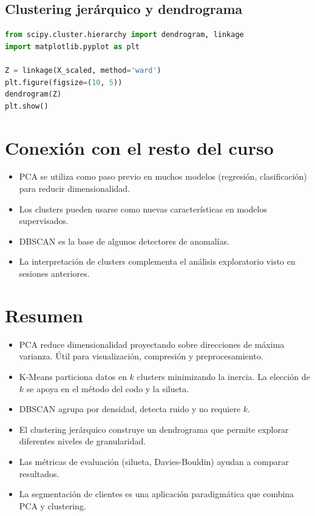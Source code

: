 \documentclass[12pt,a4paper,openany,oneside]{book}
\begin{document}
\subsection{Clustering jerárquico y dendrograma}
\begin{lstlisting}[language=Python]
from scipy.cluster.hierarchy import dendrogram, linkage
import matplotlib.pyplot as plt

Z = linkage(X_scaled, method='ward')
plt.figure(figsize=(10, 5))
dendrogram(Z)
plt.show()
\end{lstlisting}

\section{Conexión con el resto del curso}
\begin{itemize}
    \item PCA se utiliza como paso previo en muchos modelos (regresión, clasificación) para reducir dimensionalidad.
    \item Los clusters pueden usarse como nuevas características en modelos supervisados.
    \item DBSCAN es la base de algunos detectores de anomalías.
    \item La interpretación de clusters complementa el análisis exploratorio visto en sesiones anteriores.
\end{itemize}

\section{Resumen}
\begin{itemize}
    \item PCA reduce dimensionalidad proyectando sobre direcciones de máxima varianza. Útil para visualización, compresión y preprocesamiento.
    \item K-Means particiona datos en \(k\) clusters minimizando la inercia. La elección de \(k\) se apoya en el método del codo y la silueta.
    \item DBSCAN agrupa por densidad, detecta ruido y no requiere \(k\).
    \item El clustering jerárquico construye un dendrograma que permite explorar diferentes niveles de granularidad.
    \item Las métricas de evaluación (silueta, Davies-Bouldin) ayudan a comparar resultados.
    \item La segmentación de clientes es una aplicación paradigmática que combina PCA y clustering.
\end{itemize}
\end{document}
